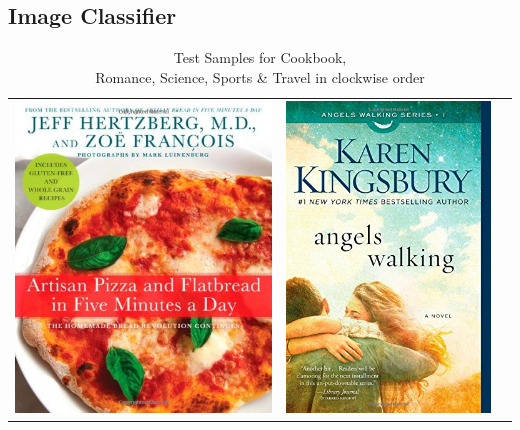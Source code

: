\documentclass[conference]{IEEEtran}
\begin{document}
\subsection{Image Classifier}

\begin{table}[hbtp]
\centering
\caption{Test Samples for Cookbook,\\ Romance, Science, Sports \& Travel in clockwise order}

\begin{center}

\begin{tabular}{c c c}
  \includegraphics[scale=0.2]{pics/results_image/0.jpeg} &
  \includegraphics[scale=0.2]{pics/results_image/1.jpeg} &

\end{tabular}
\end{center}
\end{table}
\end{document}
